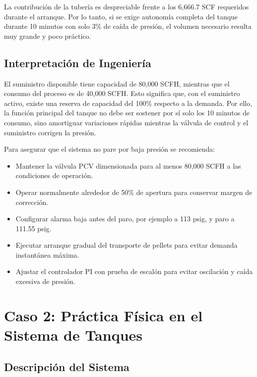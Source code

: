 \documentclass[12pt,letterpaper]{article}
\begin{document}
La contribución de la tubería es despreciable frente a los 6,666.7 SCF requeridos durante el arranque. Por lo tanto, si se exige autonomía completa del tanque durante 10 minutos con solo 3\% de caída de presión, el volumen necesario resulta muy grande y poco práctico.

\subsection*{Interpretación de Ingeniería}

El suministro disponible tiene capacidad de 80,000 SCFH, mientras que el consumo del proceso es de 40,000 SCFH. Esto significa que, con el suministro activo, existe una reserva de capacidad del 100\% respecto a la demanda. Por ello, la función principal del tanque no debe ser sostener por sí solo los 10 minutos de consumo, sino amortiguar variaciones rápidas mientras la válvula de control y el suministro corrigen la presión.

Para asegurar que el sistema no pare por baja presión se recomienda:

\begin{itemize}[itemsep=0.25em]
    \item Mantener la válvula PCV dimensionada para al menos 80,000 SCFH a las condiciones de operación.
    \item Operar normalmente alrededor de 50\% de apertura para conservar margen de corrección.
    \item Configurar alarma baja antes del paro, por ejemplo a 113 psig, y paro a 111.55 psig.
    \item Ejecutar arranque gradual del transporte de pellets para evitar demanda instantánea máxima.
    \item Ajustar el controlador PI con prueba de escalón para evitar oscilación y caída excesiva de presión.
\end{itemize}

\newpage

\section*{Caso 2: Práctica Física en el Sistema de Tanques}

\subsection*{Descripción del Sistema}
\end{document}
